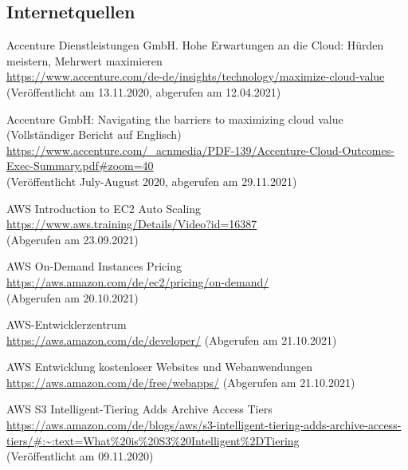 \subsection*{Internetquellen}
\begin{thebibliography}{HR08} %
  Accenture Dienstleistungen GmbH. Hohe Erwartungen an die Cloud: Hürden meistern, Mehrwert maximieren \\
  \url{https://www.accenture.com/de-de/insights/technology/maximize-cloud-value}\\
  (Veröffentlicht am 13.11.2020, abgerufen am 12.04.2021)
  
  Accenture GmbH: Navigating the barriers to maximizing cloud value (Vollständiger Bericht auf Englisch)\\
  \url{https://www.accenture.com/_acnmedia/PDF-139/Accenture-Cloud-Outcomes-Exec-Summary.pdf#zoom=40}\\
  (Veröffentlicht July-August 2020, abgerufen am 29.11.2021)

  AWS Introduction to EC2 Auto Scaling\\
  \url{https://www.aws.training/Details/Video?id=16387}\\
  (Abgerufen am 23.09.2021)

  AWS On-Demand Instances Pricing \\
  \url{https://aws.amazon.com/de/ec2/pricing/on-demand/}\\
  (Abgerufen am 20.10.2021)

  AWS-Entwicklerzentrum \\
  \url{https://aws.amazon.com/de/developer/}
  (Abgerufen am 21.10.2021)

  AWS Entwicklung kostenloser Websites
  und Webanwendungen   \\
  \url{https://aws.amazon.com/de/free/webapps/}
  (Abgerufen am 21.10.2021)


   AWS S3 Intelligent-Tiering Adds Archive Access Tiers \\
  \url{https://aws.amazon.com/de/blogs/aws/s3-intelligent-tiering-adds-archive-access-tiers/#:~:text=What%20is%20S3%20Intelligent%2DTiering}\\
  (Veröffentlicht am 09.11.2020)


\end{thebibliography}
